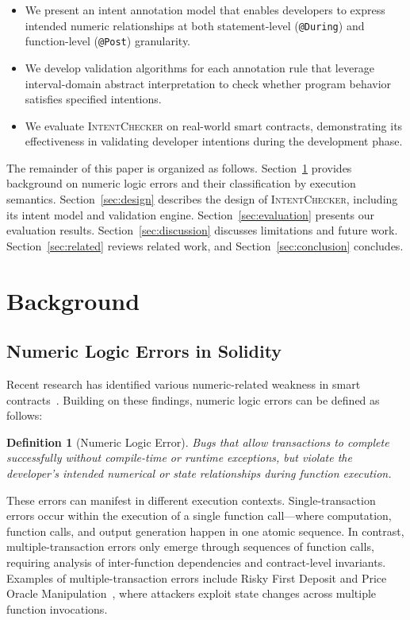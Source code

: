 \documentclass[pdflatex,sn-basic]{sn-jnl}%
\theoremstyle{thmstyleone}%
\theoremstyle{thmstyletwo}%
\theoremstyle{thmstylethree}%
\newtheorem{definition}{Definition}%
\begin{document}
\begin{itemize}
    \item We present an intent annotation model that enables developers to express intended numeric relationships at both statement-level (\texttt{@During}) and function-level (\texttt{@Post}) granularity.
    \item We develop validation algorithms for each annotation rule that leverage interval-domain abstract interpretation to check whether program behavior satisfies specified intentions.
    \item We evaluate \textsc{IntentChecker} on real-world smart contracts, demonstrating its effectiveness in validating developer intentions during the development phase.
\end{itemize}

The remainder of this paper is organized as follows.
Section~\ref{sec:background} provides background on numeric logic errors and their classification by execution semantics.
Section~\ref{sec:design} describes the design of \textsc{IntentChecker}, including its intent model and validation engine.
Section~\ref{sec:evaluation} presents our evaluation results.
Section~\ref{sec:discussion} discusses limitations and future work.
Section~\ref{sec:related} reviews related work, and Section~\ref{sec:conclusion} concludes.

\section{Background}\label{sec:background}
\subsection{Numeric Logic Errors in Solidity}

Recent research has identified various numeric-related weakness in smart contracts~\citep{numscout,gptscan,flyinointment,exploitablebugs,defiattacks}.
Building on these findings, numeric logic errors can be defined as follows:

\begin{definition}[Numeric Logic Error]
Bugs that allow transactions to complete successfully without compile-time or runtime exceptions,
but violate the developer's intended numerical or state relationships during function execution.
\end{definition}

These errors can manifest in different execution contexts.
Single-transaction errors occur within the execution of a single function call---where computation, function calls, and output generation happen in one atomic sequence.
In contrast, multiple-transaction errors only emerge through sequences of function calls, requiring analysis of inter-function dependencies and contract-level invariants.
Examples of multiple-transaction errors include Risky First Deposit and Price Oracle Manipulation~\citep{gptscan, exploitablebugs}, where attackers exploit state changes across multiple function invocations.
\end{document}
